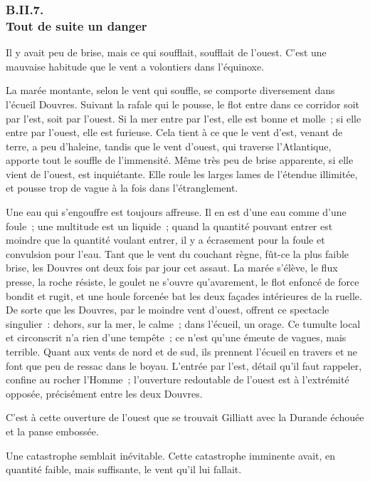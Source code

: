 \documentclass[french,twoside]{book} %
\begin{document}
 \subsubsection[{B.II.7. Tout de suite un danger}]{B.II.7. \\
Tout de suite un danger}
\noindent Il y avait peu de brise, mais ce qui soufflait, soufflait de l’ouest. C’est une mauvaise habitude que le vent a volontiers dans l’équinoxe.\par
La marée montante, selon le vent qui souffle, se comporte diversement dans l’écueil Douvres. Suivant la rafale qui le pousse, le flot entre dans ce corridor soit par l’est, soit par l’ouest. Si la mer entre par l’est, elle est bonne et molle ; si elle entre par l’ouest, elle est furieuse. Cela tient à ce que le vent d’est, venant de terre, a peu d’haleine, tandis que le vent d’ouest, qui traverse l’Atlantique, apporte tout le souffle de l’immensité. Même très peu de brise apparente, si elle vient de l’ouest, est inquiétante. Elle roule les larges lames de l’étendue illimitée, et pousse trop de vague à la fois dans l’étranglement.\par
Une eau qui s’engouffre est toujours affreuse. Il en est d’une eau comme d’une foule ; une multitude est un liquide ; quand la quantité pouvant entrer est  moindre que la quantité voulant entrer, il y a écrasement pour la foule et convulsion pour l’eau. Tant que le vent du couchant règne, fût-ce la plus faible brise, les Douvres ont deux fois par jour cet assaut. La marée s’élève, le flux presse, la roche résiste, le goulet ne s’ouvre qu’avarement, le flot enfoncé de force bondit et rugit, et une houle forcenée bat les deux façades intérieures de la ruelle. De sorte que les Douvres, par le moindre vent d’ouest, offrent ce spectacle singulier : dehors, sur la mer, le calme ; dans l’écueil, un orage. Ce tumulte local et circonscrit n’a rien d’une tempête ; ce n’est qu’une émeute de vagues, mais terrible. Quant aux vents de nord et de sud, ils prennent l’écueil en travers et ne font que peu de ressac dans le boyau. L’entrée par l’est, détail qu’il faut rappeler, confine au rocher l’Homme ; l’ouverture redoutable de l’ouest est à l’extrémité opposée, précisément entre les deux Douvres.\par
C’est à cette ouverture de l’ouest que se trouvait Gilliatt avec la Durande échouée et la panse embossée.\par
Une catastrophe semblait inévitable. Cette catastrophe imminente avait, en quantité faible, mais suffisante, le vent qu’il lui fallait.\par
\end{document}
